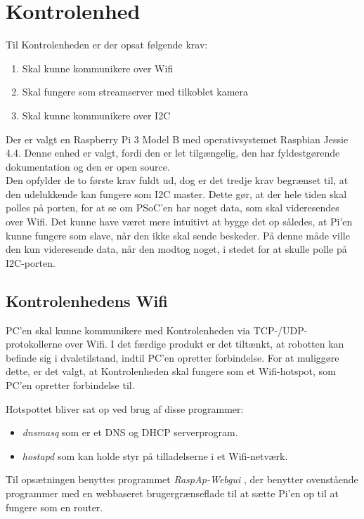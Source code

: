 \section{Kontrolenhed}
Til Kontrolenheden er der opsat følgende krav:
\begin{enumerate}
	\item Skal kunne kommunikere over Wifi
	\item Skal fungere som streamserver med tilkoblet kamera
	\item Skal kunne kommunikere over I2C
\end{enumerate}

Der er valgt en Raspberry Pi 3 Model B med operativsystemet Raspbian Jessie 4.4.
Denne enhed er valgt, fordi den er let tilgængelig, den har fyldestgørende dokumentation og den er open source. \\
Den opfylder de to første krav fuldt ud, dog er det tredje krav begrænset til, at den udelukkende kan fungere som I2C master. 
Dette gør, at der hele tiden skal polles på porten, for at se om PSoC'en har noget data, som skal videresendes over Wifi. 
Det kunne have været mere intuitivt at bygge det op således, at Pi'en kunne fungere som slave, når den ikke skal sende beskeder. 
På denne måde ville den kun videresende data, når den modtog noget, i stedet for at skulle polle på I2C-porten.

\subsection{Kontrolenhedens Wifi}
PC'en skal kunne kommunikere med Kontrolenheden via TCP-/UDP-protokollerne over Wifi. 
I det færdige produkt er det tiltænkt, at robotten kan befinde sig i dvaletilstand, indtil PC'en opretter forbindelse. 
For at muliggøre dette, er det valgt, at Kontrolenheden skal fungere som et Wifi-hotspot, som PC'en opretter forbindelse til.

Hotspottet bliver sat op ved brug af disse programmer:
\begin{itemize}
	\item \textit{dnsmasq} som er et DNS og DHCP serverprogram.
	\item \textit{hostapd} som kan holde styr på tilladelserne i et Wifi-netværk.
\end{itemize}

Til opsætningen benyttes programmet \textit{RaspAp-Webgui} \cite{raspap}, der benytter ovenstående programmer med en webbaseret brugergrænseflade til at sætte  Pi'en op til at fungere som en router.

